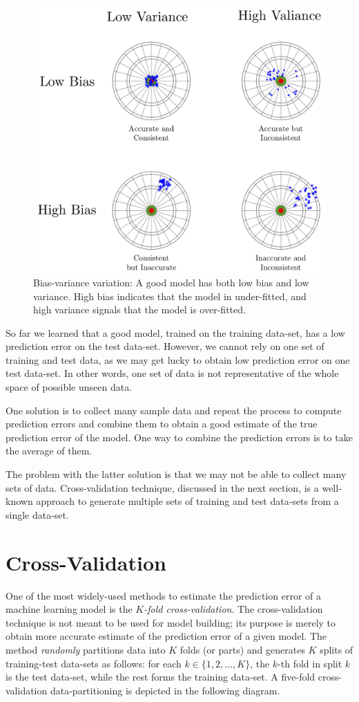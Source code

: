 \documentclass[11pt]{article}
\begin{document}
\begin{figure}[htb]
\centering
\includegraphics[width=.9\linewidth]{./images/bias-variance-dart.png}
\caption{\label{fig:orgparagraph4}
Bias-variance variation: A good model has both low bias and low variance. High bias indicates that the model in under-fitted, and high variance signals that the model is over-fitted.}
\end{figure}

So far we learned that a good model, trained on the training data-set, has a low prediction error on the test data-set. However, we cannot rely on one set of training and test data, as we may get lucky to obtain low prediction error on one test data-set. In other words, one set of data is not representative of the whole space of possible unseen data. 

One solution is to collect many sample data and repeat the process to compute prediction errors and combine them to obtain a good estimate of the true prediction error of the model. One way to combine the prediction errors is to take the average of them.

The problem with the latter solution is that we may not be able to collect many sets of data. Cross-validation technique, discussed in the next section, is a well-known approach to generate multiple sets of training and test data-sets from a single data-set.

\section{Cross-Validation}
\label{sec:orgheadline9}
One of the most widely-used methods to estimate the prediction error of a machine learning model is the \emph{\(K\)-fold cross-validation}. The cross-validation technique is not meant to be used for model building; its purpose is merely to obtain more accurate estimate of the prediction error of a given model. The method \emph{randomly} partitions data into \(K\) folds (or parts) and generates \(K\) splits of training-test data-sets as follows: for each \(k\in\{1,2,\ldots,K\}\), the \(k\)-th fold in split \(k\) is the test data-set, while the rest forms the training data-set. A five-fold cross-validation data-partitioning is depicted in the following diagram.
\end{document}
